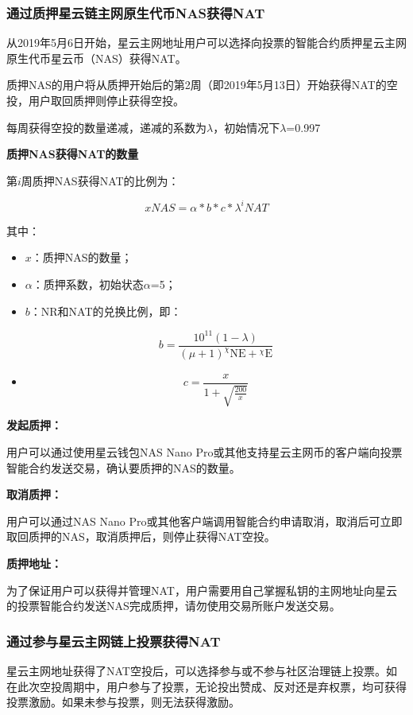 \subsubsection{通过质押星云链主网原生代币NAS获得NAT}

从2019年5月6日开始，星云主网地址用户可以选择向投票的智能合约质押星云主网原生代币星云币（NAS）获得NAT。

质押NAS的用户将从质押开始后的第2周（即2019年5月13日）开始获得NAT的空投，用户取回质押则停止获得空投。

每周获得空投的数量递减，递减的系数为$\lambda$，初始情况下$\lambda$=0.997

\textbf{质押NAS获得NAT的数量}

第$i$周质押NAS获得NAT的比例为： 

$$x NAS = \alpha*b*c*\lambda^{i} NAT$$

其中：

\begin{itemize}
	\item $x$：质押NAS的数量；
	\item $\alpha$：质押系数，初始状态$\alpha$=5；
	\item $b$：NR和NAT的兑换比例，即：

	$$b=\frac{10^{11}(1-\lambda)}{{(\mu +1)_{}^{\chi}\textrm{NE}}+{_{}^{\chi}\textrm{E}}}$$

	\item $$c=\frac{x}{1+\sqrt{\frac{200}{x}}}$$
\end{itemize}


\textbf{发起质押：} 
	
用户可以通过使用星云钱包NAS Nano Pro或其他支持星云主网币的客户端向投票智能合约发送交易，确认要质押的NAS的数量。

\textbf{取消质押：}

用户可以通过NAS Nano Pro或其他客户端调用智能合约申请取消，取消后可立即取回质押的NAS，取消质押后，则停止获得NAT空投。

\textbf{质押地址：}

为了保证用户可以获得并管理NAT，用户需要用自己掌握私钥的主网地址向星云的投票智能合约发送NAS完成质押，请勿使用交易所账户发送交易。


\subsubsection{通过参与星云主网链上投票获得NAT}

星云主网地址获得了NAT空投后，可以选择参与或不参与社区治理链上投票。如在此次空投周期中，用户参与了投票，无论投出赞成、反对还是弃权票，均可获得投票激励。如果未参与投票，则无法获得激励。

